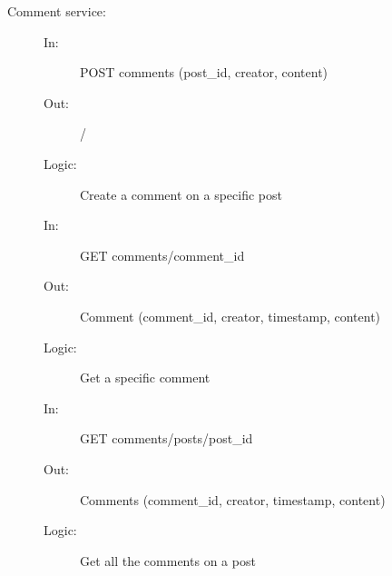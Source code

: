 \documentclass{article}
\begin{document}
\begin{description}
    \item [Comment service:] 
    \begin{description}
        \item[]
        \item[In:] POST comments (post\_id, creator, content)
        \item[Out:] /
        \item[Logic:] Create a comment on a specific post
        \item[]
        
        \item[In:] GET comments/comment\_id
        \item[Out:] Comment (comment\_id, creator, timestamp, content)
        \item[Logic:] Get a specific comment
        \item[]

        \item[In:] GET comments/posts/post\_id
        \item[Out:] Comments (comment\_id, creator, timestamp, content)
        \item[Logic:] Get all the comments on a post
        \item[]
    \end{description}
\end{description}
\end{document}
